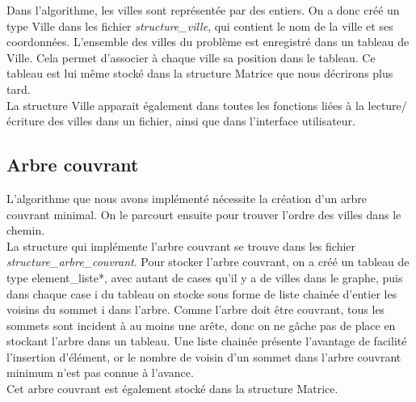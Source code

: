 \documentclass[a4paper,11pt]{article}
\begin{document}
Dans l'algorithme, les villes sont représentée par des entiers. On a donc créé un type \textsf{Ville} dans les fichier \emph{structure\_ville}, qui contient le nom de la ville et ses coordonnées. L'ensemble des villes du problème est enregistré dans un tableau de \textsf{Ville}. Cela permet d'associer à chaque ville sa position dans le tableau. Ce tableau est lui même stocké dans la structure \textsf{Matrice} que nous décrirons plus tard.\\
La structure Ville apparait également dans toutes les fonctions liées à la lecture/écriture des villes dans un fichier, ainsi que dans l'interface utilisateur.\\

\subsection{Arbre couvrant}

L'algorithme que nous avons implémenté nécessite la création d'un arbre couvrant minimal. On le parcourt ensuite pour trouver l'ordre des villes dans le chemin.\\
La structure qui implémente l'arbre couvrant se trouve dans les fichier \emph{structure\_arbre\_couvrant}. 
Pour stocker l'arbre couvrant, on a créé un tableau de type \textsf{element\_liste*}, avec autant de cases qu'il y a de villes dans le graphe, puis dans chaque case i du tableau on stocke sous forme de liste chainée d'entier les voisins du sommet i dans l'arbre. Comme l'arbre doit être couvrant, tous les sommets sont incident à au moins une arête, donc on ne gâche pas de place en stockant l'arbre dans un tableau. Une liste chainée présente l'avantage de facilité l'insertion d'élément, or le nombre de voisin d'un sommet dans l'arbre couvrant minimum n'est pas connue à l'avance.\\
Cet arbre couvrant est également stocké dans la structure Matrice.\\
\end{document}

